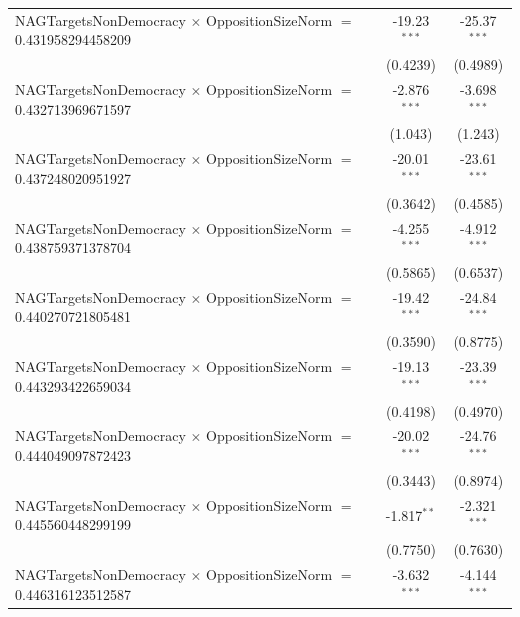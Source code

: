 \begin{tabular}{lcc}
   NAGTargetsNonDemocracy $\times$ OppositionSizeNorm $=$ 0.431958294458209     & -19.23$^{***}$       & -25.37$^{***}$\\   
                                                                                & (0.4239)             & (0.4989)\\   
   NAGTargetsNonDemocracy $\times$ OppositionSizeNorm $=$ 0.432713969671597     & -2.876$^{***}$       & -3.698$^{***}$\\   
                                                                                & (1.043)              & (1.243)\\   
   NAGTargetsNonDemocracy $\times$ OppositionSizeNorm $=$ 0.437248020951927     & -20.01$^{***}$       & -23.61$^{***}$\\   
                                                                                & (0.3642)             & (0.4585)\\   
   NAGTargetsNonDemocracy $\times$ OppositionSizeNorm $=$ 0.438759371378704     & -4.255$^{***}$       & -4.912$^{***}$\\   
                                                                                & (0.5865)             & (0.6537)\\   
   NAGTargetsNonDemocracy $\times$ OppositionSizeNorm $=$ 0.440270721805481     & -19.42$^{***}$       & -24.84$^{***}$\\   
                                                                                & (0.3590)             & (0.8775)\\   
   NAGTargetsNonDemocracy $\times$ OppositionSizeNorm $=$ 0.443293422659034     & -19.13$^{***}$       & -23.39$^{***}$\\   
                                                                                & (0.4198)             & (0.4970)\\   
   NAGTargetsNonDemocracy $\times$ OppositionSizeNorm $=$ 0.444049097872423     & -20.02$^{***}$       & -24.76$^{***}$\\   
                                                                                & (0.3443)             & (0.8974)\\   
   NAGTargetsNonDemocracy $\times$ OppositionSizeNorm $=$ 0.445560448299199     & -1.817$^{**}$        & -2.321$^{***}$\\   
                                                                                & (0.7750)             & (0.7630)\\   
   NAGTargetsNonDemocracy $\times$ OppositionSizeNorm $=$ 0.446316123512587     & -3.632$^{***}$       & -4.144$^{***}$\\   

\end{tabular}
